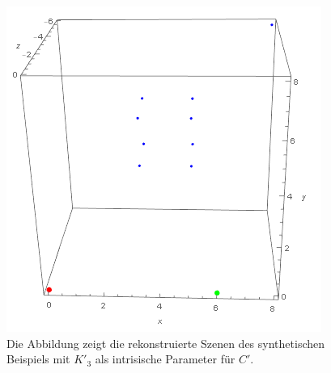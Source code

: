 %
%







\begin{figure}[!htb]
	\centering
	\includegraphics[width=0.5\linewidth]{images/DifferentAufloesungRekonstructedScene.png}
	\caption[Rekonstruierte Szene bei unterschiedlichen Kameraauflösungen]{Die Abbildung zeigt die rekonstruierte Szenen des synthetischen Beispiels mit $K'_3$ als intrisische Parameter für $C'$.} 
	\label{fig: reconstructedDifferentResolutions}
\end{figure}


